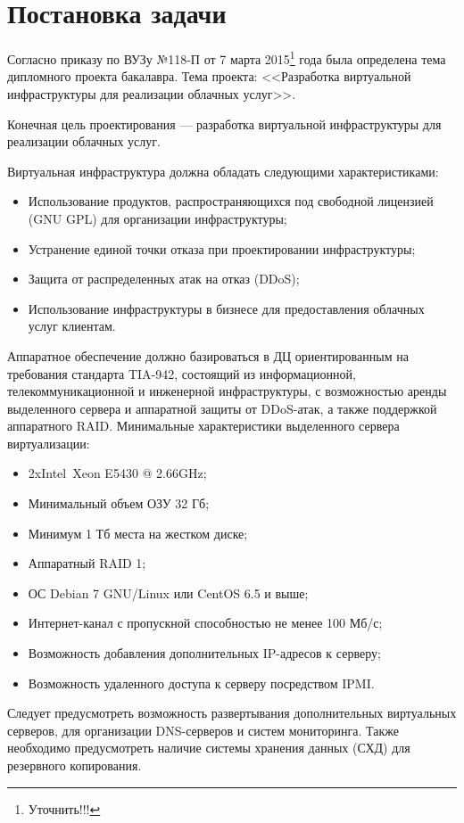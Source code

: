 \section{Постановка задачи}
Согласно приказу по ВУЗу №118-П от 7 марта 2015\footnote{Уточнить!!!} года была определена тема дипломного проекта бакалавра.
Тема проекта: <<Разработка виртуальной инфраструктуры для реализации облачных услуг>>.

Конечная цель проектирования --- разработка виртуальной инфраструктуры для реализации облачных услуг.

Виртуальная инфраструктура должна обладать следующими характеристиками:
\begin{itemize}
    \item Использование продуктов, распространяющихся под свободной лицензией (GNU GPL) для организации инфраструктуры;
    \item Устранение единой точки отказа при проектировании инфраструктуры;
    \item Защита от распределенных атак на отказ (DDoS);
    \item Использование инфраструктуры в бизнесе для предоставления облачных услуг клиентам.
\end{itemize}

Аппаратное обеспечение должно базироваться в ДЦ ориентированным на требования стандарта TIA-942, состоящий из информационной, телекоммуникационной и инженерной инфраструктуры, с возможностью аренды выделенного сервера и аппаратной защиты от DDoS-атак, а также поддержкой аппаратного RAID.
Минимальные характеристики выделенного сервера виртуализации:
\begin{itemize}
    \item 2xIntel\textregistered~Xeon E5430 @ 2.66GHz;
    \item Минимальный объем ОЗУ 32 Гб;
    \item Минимум 1 Тб места на жестком диске;
    \item Аппаратный RAID 1;
    \item ОС Debian 7 GNU/Linux или CentOS 6.5 и выше;
    \item Интернет-канал с пропускной способностью не менее 100 Мб/с;
    \item Возможность добавления дополнительных IP-адресов к серверу;
    \item Возможность удаленного доступа к серверу посредством IPMI.
\end{itemize}

Следует предусмотреть возможность развертывания дополнительных виртуальных серверов, для организации DNS-серверов и систем мониторинга.
Также необходимо предусмотреть наличие системы хранения данных (СХД) для резервного копирования.

